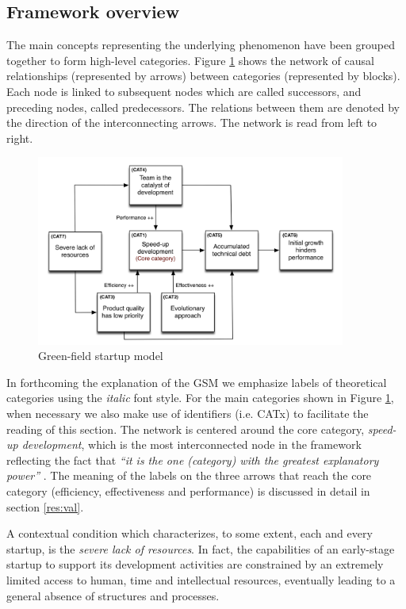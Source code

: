 \documentclass[10pt,journal,letterpaper,compsoc]{IEEEtran}
\begin{document}
\subsection{Framework overview}
\label{res:gsm:frmov}
The main concepts representing the underlying phenomenon have been grouped 
together to form high-level categories. Figure \ref{fig:gsm} shows the network 
of causal relationships (represented by arrows) between categories (represented 
by blocks). Each node is linked to subsequent nodes which are called successors, 
and preceding nodes, called predecessors. The relations between them are denoted 
by the direction of the interconnecting arrows. The network is read from left to 
right.

\begin{figure}[!t]
\centering
\includegraphics[width=4in]{figures/high-level}
\caption{Green-field startup model}\label{fig:gsm}
\end{figure}

In forthcoming the explanation of the GSM we emphasize labels of theoretical 
categories using the \textit{italic} font style. For the main categories shown 
in Figure \ref{fig:gsm}, when necessary we also make use of identifiers (i.e. 
CATx) to facilitate the reading of this section.
The network is centered around the core category, \textit{speed-up 
development}, which is the most interconnected node in the framework reflecting 
the fact that \textit{``it is the one (category) with the greatest explanatory 
power''}  \cite{Strauss1998}. The meaning of the labels on the three arrows that 
reach the core category (efficiency, effectiveness and performance) is discussed 
in detail in section \ref{res:val}. %

A contextual condition which characterizes, to some extent, each and every 
startup, is the \textit{severe lack of resources}. In fact, the capabilities of 
an early-stage startup to support its development activities are constrained by 
an extremely limited access to human, time and intellectual resources, 
eventually leading to a general absence of structures and processes.
\end{document}
